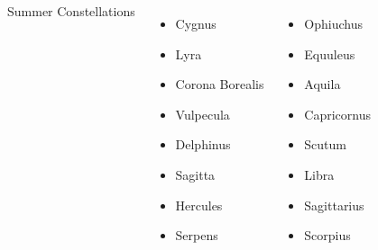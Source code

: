 \begin{frame}{\insertsubsubsectionhead}
  \begin{columns}[T,onlytextwidth]

    \centering

    {\Large Summer Constellations}
    \begin{columns}[T,onlytextwidth]
      \begin{itemize}
        \item Cygnus
        \item Lyra
        \item Corona Borealis
        \item Vulpecula
        \item Delphinus
        \item Sagitta
        \item Hercules
        \item Serpens
      \end{itemize}
      \begin{itemize}
        \item Ophiuchus
        \item Equuleus
        \item Aquila
        \item Capricornus
        \item Scutum
        \item Libra
        \item Sagittarius
        \item Scorpius
      \end{itemize}
    \end{columns}
  \end{columns}
\end{frame}


